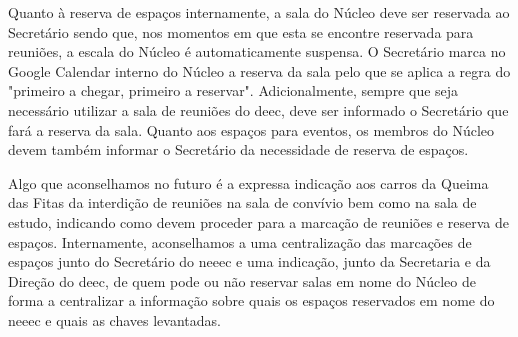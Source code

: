 Quanto à reserva de espaços internamente, a sala do Núcleo deve ser reservada ao Secretário sendo que, nos momentos em que esta se encontre reservada para reuniões, a escala do Núcleo é automaticamente suspensa. O Secretário marca no Google Calendar interno do Núcleo a reserva da sala pelo que se aplica a regra do "primeiro a chegar, primeiro a reservar". Adicionalmente, sempre que seja necessário utilizar a sala de reuniões do \acrshort{deec}, deve ser informado o Secretário que fará a reserva da sala. Quanto aos espaços para eventos, os membros do Núcleo devem também informar o Secretário da necessidade de reserva de espaços.

Algo que aconselhamos no futuro é a expressa indicação aos carros da Queima das Fitas da interdição de reuniões na sala de convívio bem como na sala de estudo, indicando como devem proceder para a marcação de reuniões e reserva de espaços. Internamente, aconselhamos a uma centralização das marcações de espaços junto do Secretário do \acrshort{neeec} e uma indicação, junto da Secretaria e da Direção do \acrshort{deec}, de quem pode ou não reservar salas em nome do Núcleo de forma a centralizar a informação sobre quais os espaços reservados em nome do \acrshort{neeec} e quais as chaves levantadas.